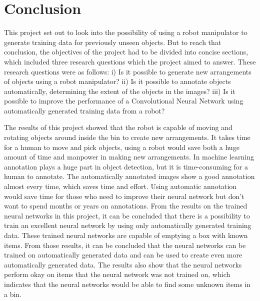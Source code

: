 \clearpage
\section{Conclusion\label{sec:conclusions}}
This project set out to look into the possibility of using a robot manipulator to generate training data for previously unseen objects. But to reach that conclusion, the objectives of the project had to be divided into concise sections, which included three research questions which the project aimed to answer. These research questions were as follows: i) Is it possible to generate new arrangements of objects using a robot manipulator? ii) Is it possible to annotate objects automatically, determining the extent of the objects in the images? iii) Is it possible to improve the performance of a Convolutional Neural Network using automatically generated training data from a robot?

The results of this project showed that the robot is capable of moving and rotating objects around inside the bin to create new arrangements. It takes time for a human to move and pick objects, using a robot would save both a huge amount of time and manpower in making new arrangements.
In machine learning annotation plays a huge part in object detection, but it is time-consuming for a human to annotate.
The automatically annotated images show a good annotation almost every time, which saves time and effort.  
Using automatic annotation would save time for those who need to improve their neural network but don't want to spend months or years on annotations.
From the results on the trained neural networks in this project, it can be concluded that there is a possibility to train an excellent neural network by using only automatically generated training data. 
These trained neural networks are capable of emptying a box with known items.
From those results, it can be concluded that the neural networks can be trained on automatically generated data and can be used to create even more automatically generated data. 
The results also show that the neural networks perform okay on items that the neural network was not trained on, which indicates that the neural networks would be able to find some unknown items in a bin.

